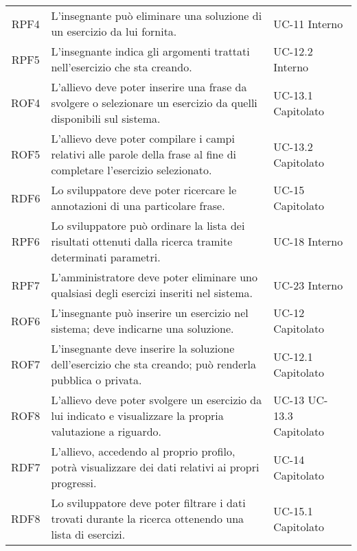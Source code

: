 \begin{tabularx}{\textwidth}{| c | p{10cm} | X |}
		RPF4 & L'insegnante può eliminare una soluzione di un esercizio da lui fornita. & UC-11 \newline Interno\\
		RPF5 & L'insegnante indica gli argomenti trattati nell'esercizio che sta creando. & UC-12.2 \newline Interno\\
		ROF4 & L'allievo deve poter inserire una frase da svolgere o selezionare un esercizio da quelli disponibili sul sistema. & UC-13.1 \newline Capitolato\\
		ROF5 & L'allievo deve poter compilare i campi relativi alle parole della frase al fine di completare l'esercizio selezionato. & UC-13.2 \newline Capitolato\\
		RDF6 & Lo sviluppatore deve poter ricercare le annotazioni di una particolare frase. & UC-15 \newline Capitolato\\
		RPF6 & Lo sviluppatore può ordinare la lista dei risultati ottenuti dalla ricerca tramite determinati parametri. & UC-18 \newline Interno\\
		RPF7 & L'amministratore deve poter eliminare uno qualsiasi degli esercizi inseriti nel sistema. & UC-23 \newline Interno\\
		ROF6 & L'insegnante può inserire un esercizio nel sistema; deve indicarne una soluzione. & UC-12 \newline Capitolato\\
		ROF7 & L'insegnante deve inserire la soluzione dell'esercizio che sta creando; può renderla pubblica o privata. & UC-12.1 \newline Capitolato\\
		ROF8 & L'allievo deve poter svolgere un esercizio da lui indicato e visualizzare la propria valutazione a riguardo. & UC-13 \newline UC-13.3 \newline Capitolato\\
		RDF7 & L'allievo, accedendo al proprio profilo, potrà visualizzare dei dati relativi ai propri progressi. & UC-14 \newline Capitolato\\
		RDF8 & Lo sviluppatore deve poter filtrare i dati trovati durante la ricerca ottenendo una lista di esercizi. & UC-15.1 \newline Capitolato\\

\end{tabularx}

